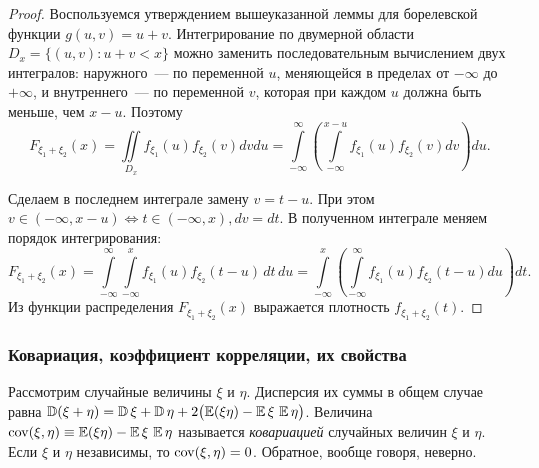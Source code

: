 \begin{proof}
    Воспользуемся утверждением вышеуказанной леммы для борелевской функции $g(u, v)=u+v$. 
    Интегрирование по двумерной области $D_{x}=\{(u, v) \colon u+v<x\}$ можно заменить последовательным вычислением двух интегралов: 
    наружного~--- по переменной $u$, меняющейся в пределах от $-\infty$ до $+\infty$, и внутреннего~--- по переменной $v$, которая при каждом $u$ должна быть меньше, чем $x-u$. 
    Поэтому
    \begin{equation*}
        F_{\xi_{1}+\xi_{2}}(x)=\iint\limits_{D_{x}} f_{\xi_{1}}(u) f_{\xi_{2}}(v) dv du=\int\limits_{-\infty}^{\infty}\left(\int\limits_{-\infty}^{x-u} f_{\xi_{1}}(u) f_{\xi_{2}}(v) dv\right) du.
    \end{equation*}
    
    Сделаем в последнем интеграле замену $v=t-u$. При этом $v \in(-\infty, x-u) \iff t \in(-\infty, x), d v=d t$. 
    В полученном интеграле меняем порядок интегрирования:
    \begin{equation*}
        F_{\xi_{1}+\xi_{2}}(x)=\int\limits_{-\infty}^{\infty} \int\limits_{-\infty}^{x} f_{\xi_{1}}(u) f_{\xi_{2}}(t-u) \,d t \,d u=\int\limits_{-\infty}^{x}\left(\int\limits_{-\infty}^{\infty} f_{\xi_{1}}(u) f_{\xi_{2}}(t-u) du\right) dt.
    \end{equation*}
    Из функции распределения $F_{\xi_{1}+\xi_{2}}(x)$ выражается плотность $f_{\xi_{1}+\xi_{2}}(t)$.
\end{proof}

\subsubsection{Ковариация, коэффициент корреляции, их свойства}

\begin{defn} Рассмотрим случайные величины $\xi$ и $\eta$. 
Дисперсия их суммы в общем случае равна $\operatorname{\mathbb{D}}(\xi+\eta)=\operatorname{\mathbb{D}} \xi+\operatorname{\mathbb{D}} \eta + 2 \bigl( \operatorname{\mathbb{E}} (\xi \eta)-\operatorname{\mathbb{E}} \xi \, \operatorname{\mathbb{E}} \eta \bigr)$. Величина $\operatorname{cov}(\xi, \eta) \equiv \operatorname{\mathbb{E}} (\xi \eta)-\operatorname{\mathbb{E}} \xi \, \operatorname{\mathbb{E}} \eta$ называется \textit{ковариацией} случайных величин $\xi$ и $\eta$. Если $\xi$ и $\eta$ независимы, то $\operatorname{cov}(\xi, \eta) = 0$. Обратное, вообще говоря, неверно.
\end{defn}

